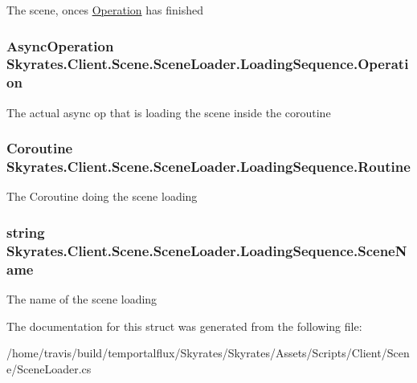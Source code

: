 The scene, onces \hyperlink{struct_skyrates_1_1_client_1_1_scene_1_1_scene_loader_1_1_loading_sequence_a6505c988f53074f64b4f1dcd49d58396}{Operation} has finished 

\hypertarget{struct_skyrates_1_1_client_1_1_scene_1_1_scene_loader_1_1_loading_sequence_a6505c988f53074f64b4f1dcd49d58396}{
\subsubsection[{Operation}]{\setlength{\rightskip}{0pt plus 5cm}Async\-Operation Skyrates.\-Client.\-Scene.\-Scene\-Loader.\-Loading\-Sequence.\-Operation}}\label{struct_skyrates_1_1_client_1_1_scene_1_1_scene_loader_1_1_loading_sequence_a6505c988f53074f64b4f1dcd49d58396}


The actual async op that is loading the scene inside the coroutine 

\hypertarget{struct_skyrates_1_1_client_1_1_scene_1_1_scene_loader_1_1_loading_sequence_a40e91dc9afde92c3229df4202f8fc7eb}{
\subsubsection[{Routine}]{\setlength{\rightskip}{0pt plus 5cm}Coroutine Skyrates.\-Client.\-Scene.\-Scene\-Loader.\-Loading\-Sequence.\-Routine}}\label{struct_skyrates_1_1_client_1_1_scene_1_1_scene_loader_1_1_loading_sequence_a40e91dc9afde92c3229df4202f8fc7eb}


The Coroutine doing the scene loading 

\hypertarget{struct_skyrates_1_1_client_1_1_scene_1_1_scene_loader_1_1_loading_sequence_a2ec62fc91db13a2c919f5c75f06c515f}{
\subsubsection[{Scene\-Name}]{\setlength{\rightskip}{0pt plus 5cm}string Skyrates.\-Client.\-Scene.\-Scene\-Loader.\-Loading\-Sequence.\-Scene\-Name}}\label{struct_skyrates_1_1_client_1_1_scene_1_1_scene_loader_1_1_loading_sequence_a2ec62fc91db13a2c919f5c75f06c515f}


The name of the scene loading 



The documentation for this struct was generated from the following file\-:\begin{DoxyCompactItemize}
\item 
/home/travis/build/temportalflux/\-Skyrates/\-Skyrates/\-Assets/\-Scripts/\-Client/\-Scene/Scene\-Loader.\-cs\end{DoxyCompactItemize}
